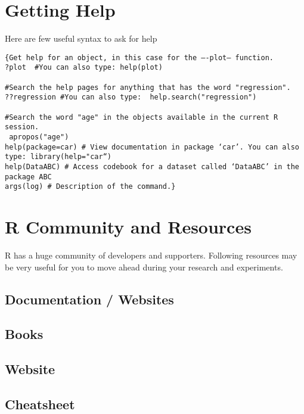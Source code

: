 \documentclass[
]{book}
\begin{document}
\hypertarget{getting-help}{%
\section{Getting Help}\label{getting-help}}

Here are few useful syntax to ask for help

\begin{verbatim}
{Get help for an object, in this case for the –-plot– function. 
?plot  #You can also type: help(plot)

#Search the help pages for anything that has the word "regression". 
??regression #You can also type:  help.search("regression")

#Search the word "age" in the objects available in the current R session.
 apropos("age")
help(package=car) # View documentation in package ‘car’. You can also type: library(help="car“)
help(DataABC) # Access codebook for a dataset called ‘DataABC’ in the package ABC
args(log) # Description of the command.}
\end{verbatim}

\hypertarget{r-community-and-resources}{%
\section{R Community and Resources}\label{r-community-and-resources}}

R has a huge community of developers and supporters. Following resources may be very useful for you to move ahead during your research and experiments.

\hypertarget{documentation-websites}{%
\subsection{Documentation / Websites}\label{documentation-websites}}

\hypertarget{books}{%
\subsection{Books}\label{books}}

\hypertarget{website}{%
\subsection{Website}\label{website}}

\hypertarget{cheatsheet}{%
\subsection{Cheatsheet}\label{cheatsheet}}
\end{document}
